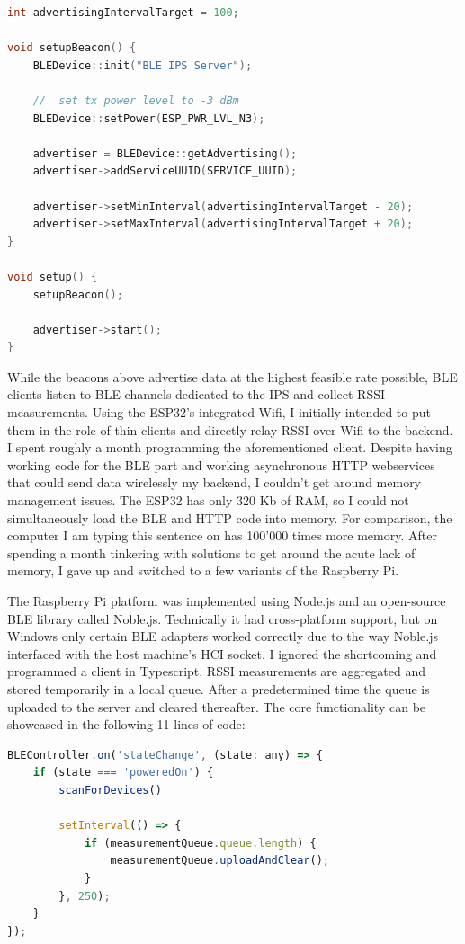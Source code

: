 \documentclass[a4paper, oneside]{ipsreport}
\begin{document}
\begin{lstlisting}[language=C++]
int advertisingIntervalTarget = 100;

void setupBeacon() {
	BLEDevice::init("BLE IPS Server");

	//  set tx power level to -3 dBm
	BLEDevice::setPower(ESP_PWR_LVL_N3);

	advertiser = BLEDevice::getAdvertising();
	advertiser->addServiceUUID(SERVICE_UUID);

	advertiser->setMinInterval(advertisingIntervalTarget - 20);
	advertiser->setMaxInterval(advertisingIntervalTarget + 20);
}

void setup() {
	setupBeacon();

	advertiser->start();
}
\end{lstlisting}

While the beacons above advertise data at the highest feasible rate possible, BLE clients listen to BLE channels dedicated to the IPS and collect RSSI measurements. Using the ESP32's integrated Wifi, I initially intended to put them in the role of thin clients and directly relay RSSI over Wifi to the backend. I spent roughly a month programming the aforementioned client. Despite having working code for the BLE part and working asynchronous HTTP webservices that could send data wirelessly my backend, I couldn't get around memory management issues. The ESP32 has only 320 Kb of RAM, so I could not simultaneously load the BLE and HTTP code into memory. For comparison, the computer I am typing this sentence on has 100'000 times more memory. After spending a month tinkering with solutions to get around the acute lack of memory, I gave up and switched to a few variants of the Raspberry Pi.

The Raspberry Pi platform was implemented using Node.js and an open-source BLE library called Noble.js. Technically it had cross-platform support, but on Windows only certain BLE adapters worked correctly due to the way Noble.js interfaced with the host machine's HCI socket. I ignored the shortcoming and programmed a client in Typescript. RSSI measurements are aggregated and stored temporarily in a local queue. After a predetermined time the queue is uploaded to the server and cleared thereafter. The core functionality can be showcased in the following 11 lines of code:

\begin{lstlisting}[language=JavaScript, caption=IPS Client Core Functionality]
BLEController.on('stateChange', (state: any) => {
    if (state === 'poweredOn') {
        scanForDevices()

        setInterval(() => {
            if (measurementQueue.queue.length) {
                measurementQueue.uploadAndClear();
            }
        }, 250);
    }
});

\end{lstlisting}
\end{document}
